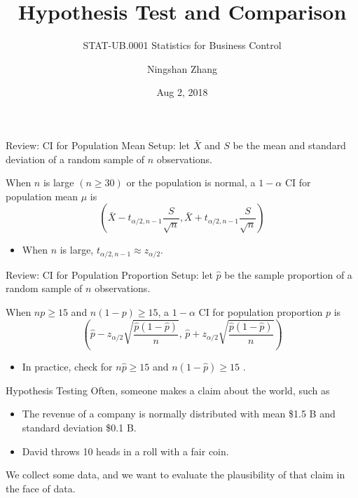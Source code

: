 \documentclass{beamer}
\title{Hypothesis Test and Comparison}
\subtitle{STAT-UB.0001 Statistics for Business Control}
\author{Ningshan Zhang}
\institute[New York University] %
{
  IOMS Department\\
  nzhang@stern.nyu.edu
  \let\thefootnote\relax\footnotetext{\tiny{*  Office Hours: Wed \& Fri 10:00 - 11:30 AM, KMC 8-174}}
}
\date{Aug 2, 2018}
\newcommand{\h}{\widehat}
\begin{document}
\begin{frame}
  \titlepage
\end{frame}


\begin{frame}{Review: CI for Population Mean}
Setup: let $\bar X$ and $S$ be the mean and standard deviation of a random sample of $n$ observations.

When $n$ is large $(n\geq 30)$ or the population is normal, a $1-\alpha$ CI for population mean $\mu$ is 
\[ (\bar X -{t_{\alpha/2,n-1}} \frac{S}{\sqrt{n}} , \bar X +{t_{\alpha/2,n-1}} \frac{S}{\sqrt{n}}) \]
\begin{itemize}
\item When $n$ is large, $t_{\alpha/2,n-1} \approx z_{\alpha/2}$.
\end{itemize}
\end{frame}

\begin{frame}{Review: CI for Population Proportion}
Setup: let $\h p$ be the sample proportion of a random sample of $n$ observations. 

When $np \geq 15$ and $n(1-p) \geq 15$, a $1-\alpha$ CI for population proportion $p$ is 
\[
\left( \h p - z_{\alpha/2} \sqrt{\frac{\h p(1-\h p)}{n}},\, 
 \h p + z_{\alpha/2} \sqrt{\frac{\h p(1-\h p)}{n}}\right)
\]
\begin{itemize}
\item In practice, check for $n \h p\geq 15$ and $n (1-\h p) \geq 15$ .
\end{itemize}
\end{frame}

\begin{frame}{Hypothesis Testing}
Often, someone makes a claim about the world, such as 
\begin{itemize}
\item The revenue of a company is normally distributed with mean \$1.5 B and standard deviation \$0.1 B.
\item David throws 10 heads in a roll with a fair coin.
\end{itemize}

We collect some data, and we want to evaluate the plausibility of that claim in the face of data.
\end{frame}
\end{document}
